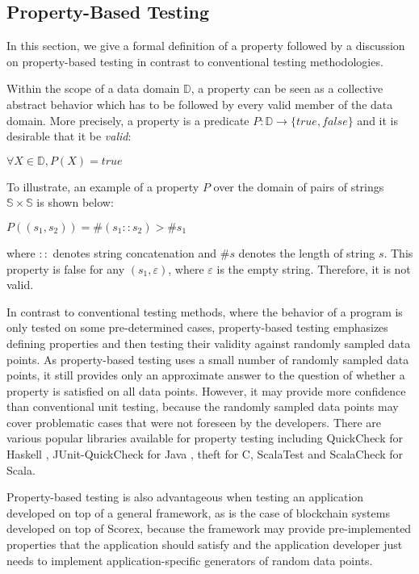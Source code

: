 
\newcommand{\avector}[2]{(#1_1,#1_2,\ldots,#1_{#2})}
\newcommand{\aDEFvector}[2][a]{(#1_1,#1_2,\ldots,#1_{#2})}

\subsection{Property-Based Testing}
In this section, we give a formal definition of a property followed by a discussion on property-based testing in contrast to conventional testing methodologies.

Within the scope of a data domain $\mathbb{D}$, a property can be seen as a collective abstract behavior which has to be followed by every valid member of the data domain. More precisely, a property is a predicate $P: \mathbb{D} \rightarrow \{true, false\}$ and it is desirable that it be \emph{valid}: 
\begin{center}
$\forall X \in \mathbb{D}, P(X) = true$
\end{center}
To illustrate, an example of a property $P$ over the domain of pairs of strings $\mathbb{S} \times \mathbb{S}$ is shown below:
\begin{center}
$P((s_1, s_2)) = \#(s_1::s_2) > \#s_1$
\end{center}
where $::$ denotes string concatenation and $\#s$ denotes the length of string $s$. This property is false for any $(s_1, \varepsilon)$, where $\varepsilon$ is the empty string. Therefore, it is not valid.

In contrast to conventional testing methods, where the behavior of a program is only tested on some pre-determined cases, property-based testing \cite{ron2001property} emphasizes defining properties and then testing their validity against randomly sampled data points. As property-based testing uses a small number of randomly sampled data points, it still provides only an approximate answer to the question of whether a property is satisfied on all data points. However, it may provide more confidence than conventional unit testing, because the randomly sampled data points may cover problematic cases that were not foreseen by the developers. There are various popular libraries available for property testing including QuickCheck for Haskell \cite{claessen2011quickcheck}, JUnit-QuickCheck for Java \cite{jung2015quickcheck}, theft for C, ScalaTest \cite{venners2009scalatest} and ScalaCheck \cite{nilsson2014scalacheck} for Scala.

Property-based testing is also advantageous when testing an application developed on top of a general framework, as is the case of blockchain systems developed on top of Scorex, because the framework may provide pre-implemented properties that the application should satisfy and the application developer just needs to implement application-specific generators of random data points.
\nocite{holzmann1995improvement}
\nocite{zaki2008formal}
